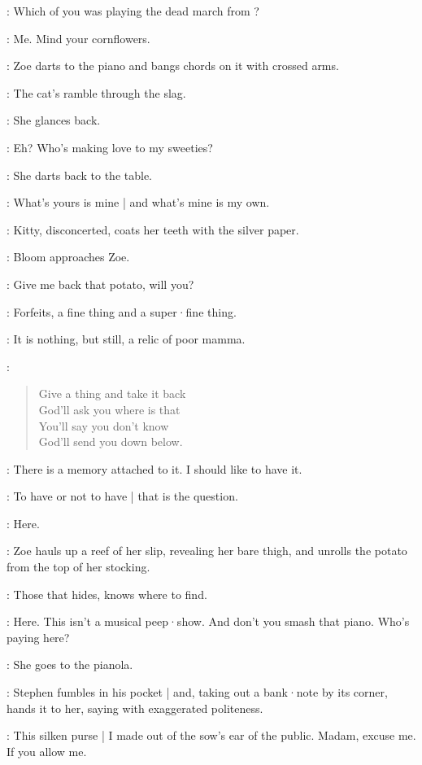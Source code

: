 \Bella:
Which of you was playing the dead march from ?

\Zoe[4a]:
Me.
Mind your cornflowers.

:
Zoe darts to the piano and bangs chords on it with crossed arms.

\Zoe:
The cat's ramble through the slag.

:
She glances back.

\Zoe:
Eh?
Who's making love to my sweeties?

:
She darts back to the table.

\Zoe:
What's yours is mine |
and what's mine is my own.

:
Kitty,
disconcerted,
coats her teeth with the silver paper.

:
Bloom approaches Zoe.

\Bloom:
Give me back that potato,
will you?

\Zoe:
Forfeits,
a fine thing and a super·fine thing.

\Bloom:
It is nothing,
but still,
a relic of poor mamma.

\Zoe:
\begin{verse}
    Give a thing and take it back\\
    God'll ask you where is that\\
    You'll say you don't know\\
    God'll send you down below.
\end{verse}

\Bloom:
There is a memory attached to it.
%
I should like to have it.

\Stephen[4a]:
To have or not to have |
that is the question.

\Zoe:
Here.

:
Zoe hauls up a reef of her slip,
revealing her bare thigh,
and unrolls the potato from the top of her stocking.

\Zoe:
Those that hides,
knows where to find.

\Bella:
Here.
This isn't a musical peep·show.
And don't you smash that piano.
Who's paying here?

:
She goes to the pianola.

:
Stephen fumbles in his pocket |
and,
taking out a bank·note by its corner,
hands it to her,
saying with exaggerated politeness.

\Stephen:
This silken purse |
I made out of the sow's ear of the public.
Madam,
excuse me.
If you allow me.

